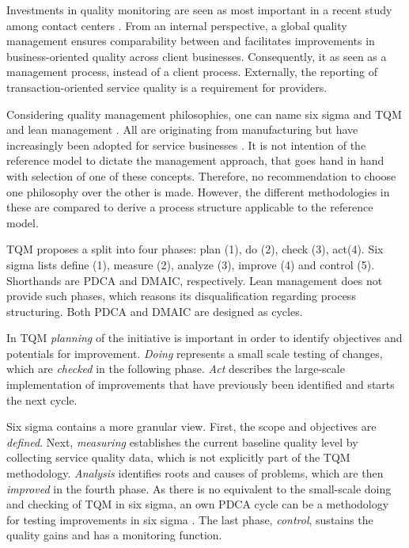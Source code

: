 	 Investments in quality monitoring are seen as most important in a recent study among contact centers \citep{ccnet2016}. From an internal perspective, a global quality management ensures comparability between and facilitates improvements in business-oriented quality across client businesses. Consequently, it as seen as a management process, instead of a client process. Externally, the reporting of transaction-oriented service quality is a requirement for providers. 
	
	Considering quality management philosophies, one can name six sigma and \acrshort{TQM} and lean management \citep{Andersson_2006}. All are originating from manufacturing but have increasingly been adopted for service businesses \citep{Antony_2007}. It is not intention of the reference model to dictate the management approach, that goes hand in hand with selection of one of these concepts. Therefore, no recommendation to choose one philosophy over the other is made. However, the different methodologies in these are compared to derive a process structure applicable to the reference model. 
	
	\acrshort{TQM} proposes a split into four phases: plan (1), do (2), check (3), act(4). Six sigma lists define (1), measure (2), analyze (3), improve (4) and control (5). Shorthands are \acrshort{PDCA} and \acrshort{DMAIC}, respectively. Lean management does not provide such phases, which reasons its disqualification regarding process structuring. Both \acrshort{PDCA} and \acrshort{DMAIC} are designed as cycles. 
	
	In \acrshort{TQM} \textit{planning} of the initiative is important in order to identify objectives and potentials for improvement. \textit{Doing} represents a small scale testing of changes, which are \textit{checked} in the following phase. \textit{Act} describes the large-scale implementation of improvements that have previously been identified and starts the next cycle. 
	
	Six sigma contains a more granular view. First, the scope and objectives are \textit{defined}. Next, \textit{measuring} establishes the current baseline quality level by collecting service quality data, which is not explicitly part of the \acrshort{TQM} methodology. \textit{Analysis} identifies roots and causes of problems, which are then \textit{improved} in the fourth phase. As there is no equivalent to the small-scale doing and checking of \acrshort{TQM} in six sigma, an own \acrshort{PDCA} cycle can be a methodology for testing improvements in six sigma \citep{9780071840538}. The last phase, \textit{control}, sustains the quality gains and has a monitoring function.
	
